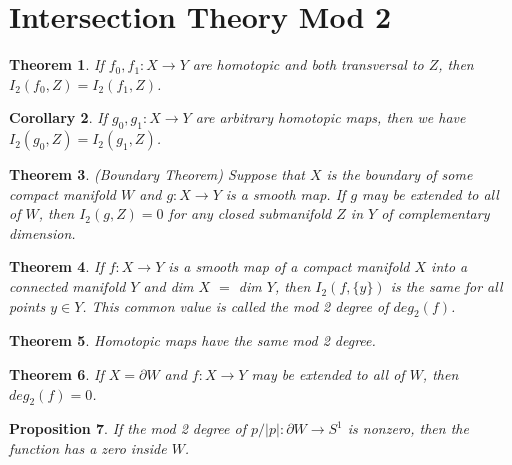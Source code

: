 \documentclass[psamsfonts]{amsart}
\newtheorem{theorem}{Theorem}[section]
\newtheorem{cor}[theorem]{Corollary}
\newtheorem{prop}[theorem]{Proposition}
\theoremstyle{definition}
\theoremstyle{remark}
\numberwithin{equation}{section}
\begin{document}
	\section{Intersection Theory Mod 2}
		\begin{theorem}
			If $f_0,f_1: X\to Y$ are homotopic and both transversal to $Z$, then $I_2(f_0,Z) = I_2(f_1,Z)$.
		\end{theorem}
		\begin{cor}
			If $g_0,g_1: X \to Y$ are arbitrary homotopic maps, then we have $I_2(g_0,Z) = I_2(g_1,Z)$.
		\end{cor}
		\begin{theorem}(Boundary Theorem)
			Suppose that $X$ is the boundary of some compact manifold $W$ and $g: X \to Y$ is a smooth map. If $g$ may be extended to all of $W$, then $I_2(g,Z) = 0$ for any closed submanifold $Z$ in $Y$ of complementary dimension.
		\end{theorem}
		\begin{theorem}
			If $f: X \to Y$ is a smooth map of a compact manifold $X$ into a connected manifold $Y$ and dim $X$ $=$ dim $Y$, then $I_2(f,\{y\})$ is the same for all points $y \in Y$. This common value is called the mod 2 degree of $deg_2(f)$. 
		\end{theorem}
		\begin{theorem}
			Homotopic maps have the same mod 2 degree.
		\end{theorem}
		\begin{theorem}
			If $X = \partial W$ and $f: X \to Y$ may be extended to all of $W$, then $deg_2(f) = 0$.
		\end{theorem}
		\begin{prop}
			If the mod 2 degree of $p/ | p | : \partial W \to S^1$ is nonzero, then the function has a zero inside $W$.
		\end{prop}
\end{document}
